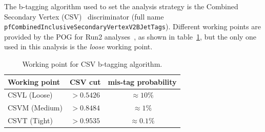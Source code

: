 The b-tagging algorithm used to set the analysis strategy is the Combined Secondary Vertex (CSV)~\cite{bib:btag} discriminator (full name {\tt pfCombinedInclusiveSecondaryVertexV2BJetTags}). Different working points are provided by the POG for Run2 analyses~\cite{BTVPOG}, as shown in table~\ref{tab:btag}, but the only one used in this analysis is the \emph{loose} working point.

\begin{table}[!htb]
  \centering
  \label{tab:btag}
  \begin{tabular}{l|c|c}
     Working point & CSV cut & mis-tag probability\\ 
    \hline
     CSVL (Loose)  & $>0.5426$ & $\approx 10\%$  \\ 
     CSVM (Medium) & $>0.8484$ & $\approx 1\%$   \\ 
     CSVT (Tight)  & $>0.9535$ & $\approx 0.1\%$ \\ 
    \hline
  \end{tabular}
  \caption{Working point for CSV b-tagging algorithm.}
  
\end{table}

